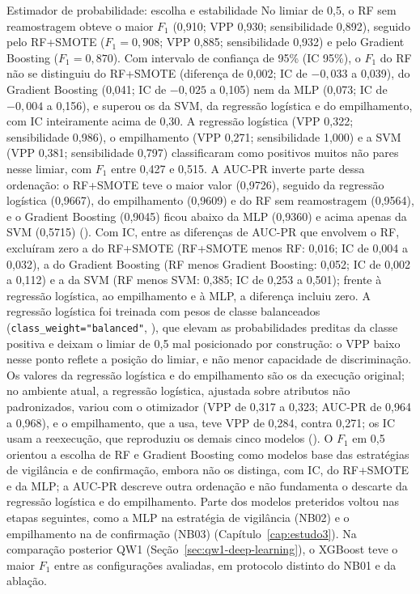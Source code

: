 \begin{chapter}{Estimador de probabilidade: escolha e estabilidade}
No limiar de 0,5, o RF sem reamostragem obteve o maior $F_1$ (0,910; VPP 0,930; sensibilidade 0,892), seguido pelo RF+SMOTE ($F_1 = 0{,}908$; VPP 0,885; sensibilidade 0,932) e pelo Gradient Boosting ($F_1 = 0{,}870$). Com intervalo de confiança de 95\% (IC 95\%), o $F_1$ do RF não se distinguiu do RF+SMOTE (diferença de 0,002; IC de $-0{,}033$ a 0,039), do Gradient Boosting (0,041; IC de $-0{,}025$ a 0,105) nem da MLP (0,073; IC de $-0{,}004$ a 0,156), e superou os da SVM, da regressão logística e do empilhamento, com IC inteiramente acima de 0,30. A regressão logística (VPP 0,322; sensibilidade 0,986), o empilhamento (VPP 0,271; sensibilidade 1,000) e a SVM (VPP 0,381; sensibilidade 0,797) classificaram como positivos muitos não pares nesse limiar, com $F_1$ entre 0,427 e 0,515. A AUC-PR inverte parte dessa ordenação: o RF+SMOTE teve o maior valor (0,9726), seguido da regressão logística (0,9667), do empilhamento (0,9609) e do RF sem reamostragem (0,9564), e o Gradient Boosting (0,9045) ficou abaixo da MLP (0,9360) e acima apenas da SVM (0,5715) (). Com IC, entre as diferenças de AUC-PR que envolvem o RF, excluíram zero a do RF+SMOTE (RF+SMOTE menos RF: 0,016; IC de 0,004 a 0,032), a do Gradient Boosting (RF menos Gradient Boosting: 0,052; IC de 0,002 a 0,112) e a da SVM (RF menos SVM: 0,385; IC de 0,253 a 0,501); frente à regressão logística, ao empilhamento e à MLP, a diferença incluiu zero. A regressão logística foi treinada com pesos de classe balanceados (\texttt{class\_weight="balanced"}, ), que elevam as probabilidades preditas da classe positiva e deixam o limiar de 0,5 mal posicionado por construção: o VPP baixo nesse ponto reflete a posição do limiar, e não menor capacidade de discriminação. Os valores da regressão logística e do empilhamento são os da execução original; no ambiente atual, a regressão logística, ajustada sobre atributos não padronizados, variou com o otimizador (VPP de 0,317 a 0,323; AUC-PR de 0,964 a 0,968), e o empilhamento, que a usa, teve VPP de 0,284, contra 0,271; os IC usam a reexecução, que reproduziu os demais cinco modelos (). O $F_1$ em 0,5 orientou a escolha de RF e Gradient Boosting como modelos base das estratégias de vigilância e de confirmação, embora não os distinga, com IC, do RF+SMOTE e da MLP; a AUC-PR descreve outra ordenação e não fundamenta o descarte da regressão logística e do empilhamento. Parte dos modelos preteridos voltou nas etapas seguintes, como a MLP na estratégia de vigilância (NB02) e o empilhamento na de confirmação (NB03) (Capítulo~\ref{cap:estudo3}). Na comparação posterior QW1 (Seção~\ref{sec:qw1-deep-learning}), o XGBoost teve o maior $F_1$ entre as configurações avaliadas, em protocolo distinto do NB01 e da ablação.


\end{chapter}
